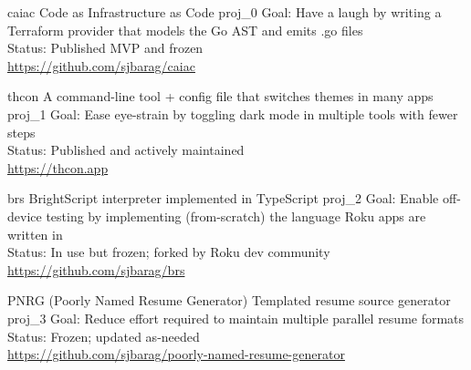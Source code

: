 \documentclass[10pt]{barag_resume}
\begin{document}
    \newpage %
\relax
    \begin{project}
        {caiac}
        {Code as Infrastructure as Code}
        {proj_0}
            Goal: Have a laugh by writing a Terraform provider that models the Go AST and emits .go files\\
            Status: Published MVP and frozen \\ 
            \url{https://github.com/sjbarag/caiac}
    \end{project}

    \begin{project}
        {thcon}
        {A command-line tool + config file that switches themes in many apps}
        {proj_1}
            Goal: Ease eye-strain by toggling dark mode in multiple tools with fewer steps\\
            Status: Published and actively maintained \\ 
            \url{https://thcon.app}
    \end{project}

    \begin{project}
        {brs}
        {BrightScript interpreter implemented in TypeScript}
        {proj_2}
            Goal: Enable off-device testing by implementing (from-scratch) the language Roku apps are written in\\
            Status: In use but frozen; forked by Roku dev community \\ 
            \url{https://github.com/sjbarag/brs}
    \end{project}

    \begin{project}
        {PNRG (Poorly Named Resume Generator)}
        {Templated resume source generator}
        {proj_3}
            Goal: Reduce effort required to maintain multiple parallel resume formats\\
            Status: Frozen; updated as-needed \\ 
            \url{https://github.com/sjbarag/poorly-named-resume-generator}
    \end{project}
\end{document}
